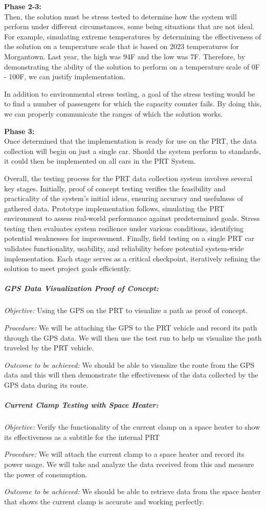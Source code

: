 \noindent\textbf{Phase 2-3:}\\
\indent Then, the solution must be stress tested to determine how the system will perform under different circumstances, some being situations that are not ideal. 
For example, simulating extreme temperatures by determining the effectiveness of the solution on a temperature scale that is based on 2023 temperatures for Morgantown. 
Last year, the high was 94F and the low was 7F. 
Therefore, by demonstrating the ability of the solution to perform on a temperature scale of 0F - 100F, we can justify implementation.

In addition to environmental stress testing, a goal of the stress testing would be to find a number of passengers for which the capacity counter fails.
By doing this, we can properly communicate the ranges of which the solution works.

\noindent\textbf{Phase 3:}\\
\indent Once determined that the implementation is ready for use on the PRT, the data collection will begin on just a single car. 
Should the system perform to standards, it could then be implemented on all cars in the PRT System.


Overall, the testing process for the PRT data collection system involves several key stages. 
Initially, proof of concept testing verifies the feasibility and practicality of the system's initial ideas, ensuring accuracy and usefulness of gathered data. 
Prototype implementation follows, simulating the PRT environment to assess real-world performance against predetermined goals. 
Stress testing then evaluates system resilience under various conditions, identifying potential weaknesses for improvement. 
Finally, field testing on a single PRT car validates functionality, usability, and reliability before potential system-wide implementation. 
Each stage serves as a critical checkpoint, iteratively refining the solution to meet project goals efficiently.

\subparagraph{GPS Data Visualization Proof of Concept:}
\textit{Objective:} Using the GPS on the PRT to visualize a path as proof of concept.

\textit{Procedure:} We will be attaching the GPS to the PRT vehicle and record its path through the GPS data. We will then use the test run to help us visualize the path traveled by the PRT vehicle.

\textit{Outcome to be achieved:} We should be able to visualize the route from the GPS data and this will then demonstrate the effectiveness of the data collected by the GPS data during its route.

\subparagraph{Current Clamp Testing with Space Heater:}
\textit{Objective:} Verify the functionality of the current clamp on a space heater to show its effectiveness as a subtitle for the internal PRT

\textit{Procedure:} We will attach the current clamp to a space heater and record its power usage. We will take and analyze the data received from this and measure the power of consumption.

\textit{Outcome to be achieved:} We should be able to retrieve data from the space heater that shows the current clamp is accurate and working perfectly.
